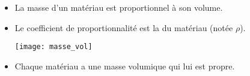 \begin{mybilan}
	\begin{itemize}
		\item La masse d'un matériau est proportionnel à son volume.
		\item Le coefficient de proportionnalité est la  du matériau (notée $\rho$).
		
		\begin{center}
			\texttt{[image: masse\_vol]}
		\end{center}
	
		\item Chaque matériau a une masse volumique qui lui est propre.
	\end{itemize}


\end{mybilan}